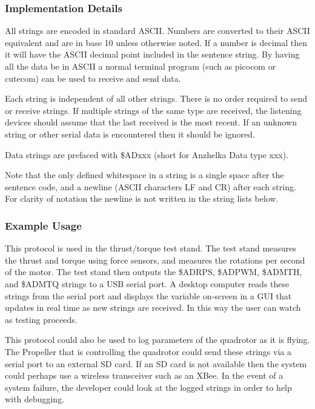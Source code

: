 \documentclass{article}
\numberwithin{equation}{section} %
\begin{document}
\subsubsection{Implementation Details}
All strings are encoded in standard ASCII. Numbers are converted to their ASCII equivalent and are in base 10 unless otherwise noted. If a number is decimal then it will have the ASCII decimal point included in the sentence string. By having all the data be in ASCII a normal terminal program (such as picocom or cutecom) can be used to receive and send data. 

Each string is independent of all other strings. There is no order required to send or receive strings. If multiple strings of the same type are received, the listening devices should assume that the last received is the most recent. If an unknown string or other serial data is encountered then it should be ignored.

Data strings are prefaced with \$ADxxx (short for Anzhelka Data type xxx). 

Note that the only defined whitespace in a string is a single space after the sentence code, and a newline (ASCII characters LF and CR) after each string. For clarity of notation the newline is not written in the string lists below.

\subsubsection{Example Usage}
This protocol is used in the thrust/torque test stand. The test stand measures the thrust and torque using force sensors, and measures the rotations per second of the motor. The test stand then outputs the \$ADRPS, \$ADPWM, \$ADMTH, and \$ADMTQ strings to a USB serial port. A desktop computer reads these strings from the serial port and displays the variable on-screen in a GUI that updates in real time as new strings are received. In this way the user can watch as testing proceeds.

This protocol could also be used to log parameters of the quadrotor as it is flying. The Propeller that is controlling the quadrotor could send these strings via a serial port to an external SD card. If an SD card is not available then the system could perhaps use a wireless transceiver such as an XBee. In the event of a system failure, the developer could look at the logged strings in order to help with debugging. 
\end{document}

